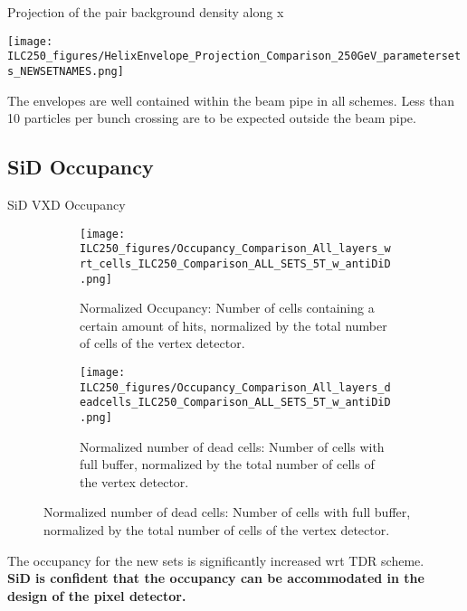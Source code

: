 \documentclass[xcolor={dvipsnames}]{beamer}
\begin{document}
\begin{frame}{Projection of the pair background density along x}
\begin{center}
 \texttt{[image: ILC250\_figures/HelixEnvelope\_Projection\_Comparison\_250GeV\_parametersets\_NEWSETNAMES.png]}
\end{center}
The envelopes are well contained within the beam pipe in all schemes. Less than 10 particles per bunch crossing are to be expected outside the beam pipe.
\end{frame}

\subsection{SiD Occupancy}
\begin{frame}{SiD VXD Occupancy}
 \begin{figure}
\centering
\begin{subfigure}[t]{0.48\textwidth}
\centering
\texttt{[image: ILC250\_figures/Occupancy\_Comparison\_All\_layers\_wrt\_cells\_ILC250\_Comparison\_ALL\_SETS\_5T\_w\_antiDiD.png]}
\caption{\alert{Normalized Occupancy}: Number of cells containing a certain amount of hits, normalized by the total number of cells of the vertex detector.}
\end{subfigure}
\hspace*{0.2cm}
\begin{subfigure}[t]{0.48\textwidth}
\centering
\texttt{[image: ILC250\_figures/Occupancy\_Comparison\_All\_layers\_deadcells\_ILC250\_Comparison\_ALL\_SETS\_5T\_w\_antiDiD.png]}
\caption{\alert{Normalized number of dead cells}: Number of cells with full buffer, normalized by the total number of cells of the vertex detector.}
\end{subfigure}
\end{figure}
The occupancy for the new sets is significantly increased wrt TDR scheme.\\
\textbf{SiD is confident that the occupancy can be accommodated in the design of the pixel detector.}
\end{frame}
\end{document}
